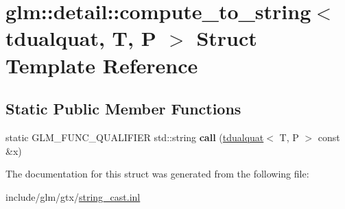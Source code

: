 \hypertarget{structglm_1_1detail_1_1compute__to__string_3_01tdualquat_00_01T_00_01P_01_4}{}\section{glm\+:\+:detail\+:\+:compute\+\_\+to\+\_\+string$<$ tdualquat, T, P $>$ Struct Template Reference}
\label{structglm_1_1detail_1_1compute__to__string_3_01tdualquat_00_01T_00_01P_01_4}
\subsection*{Static Public Member Functions}
\begin{DoxyCompactItemize}
\item 
\mbox{\label{structglm_1_1detail_1_1compute__to__string_3_01tdualquat_00_01T_00_01P_01_4_a1768ea4c6a68bcecf9571363b69c1497}} 
static G\+L\+M\+\_\+\+F\+U\+N\+C\+\_\+\+Q\+U\+A\+L\+I\+F\+I\+ER std\+::string {\bfseries call} (\hyperlink{structglm_1_1tdualquat}{tdualquat}$<$ T, P $>$ const \&x)
\end{DoxyCompactItemize}


The documentation for this struct was generated from the following file\+:\begin{DoxyCompactItemize}
\item 
include/glm/gtx/\hyperlink{string__cast_8inl}{string\+\_\+cast.\+inl}\end{DoxyCompactItemize}
